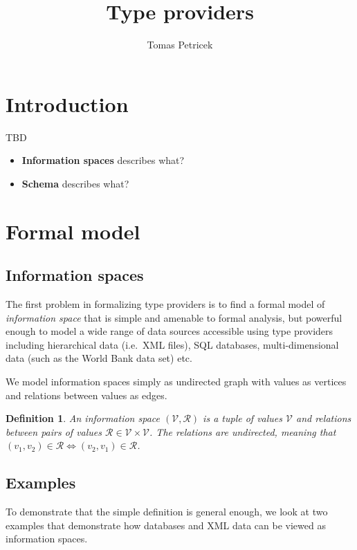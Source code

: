 \documentclass[10pt,a4paper]{article}
\newtheorem{definition}{Definition}
\newcommand{\calv}{\mathcal{V}}
\newcommand{\calr}{\mathcal{R}}
\begin{document}
\title{Type providers}
\author{Tomas Petricek} 
\maketitle


\section{Introduction}
TBD
\begin{itemize}
\item \textbf{Information spaces} describes what?
\item \textbf{Schema} describes what?
\end{itemize}

\newpage
\section{Formal model}

\subsection{Information spaces}
The first problem in formalizing type providers is to find a formal model of \emph{information space}
that is simple and amenable to formal analysis, but powerful enough to model a wide range of data
sources accessible using type providers including hierarchical data (i.e.\ XML files), SQL databases, 
multi-dimensional data (such as the World Bank data set) etc. 

We model information spaces simply as undirected graph with values as vertices and relations
between values as edges.

\begin{definition}
An \emph{information space} $(\calv, \calr)$ is a tuple of values $\calv$ and relations between
pairs of values $\calr \in \calv \times \calv$. The relations are undirected, meaning that 
$(v_1, v_2) \in \calr \Leftrightarrow (v_2, v_1) \in \calr$. 
\end{definition}

\subsection{Examples} 
To demonstrate that the simple definition is general enough, we look at two examples 
that demonstrate how databases and XML data can be viewed as information spaces.
\end{document}
